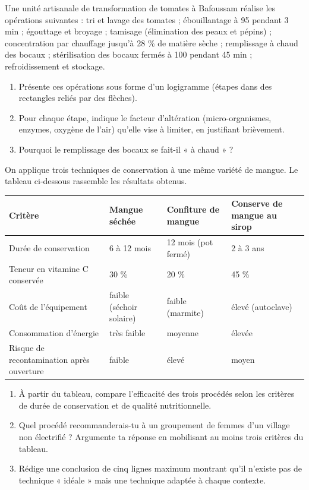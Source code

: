 \documentclass[11pt]{article}
\newcounter{popsec}
\newcounter{popsub}
\newcommand{\courssub}[1]{%
  \stepcounter{popsub}%
  \par\vspace{9pt}\noindent{\popxbold\fontsize{11.5}{13}\selectfont\color{popink}{\color{poporange}\thepopsec.\thepopsub}\hspace{6pt}#1}\par\nopagebreak\vspace{4pt}
}
\begin{document}
\courssub{Je m'entraîne}

\begin{exercice}
Une unité artisanale de transformation de tomates à Bafoussam réalise les opérations suivantes : tri et lavage des tomates ; ébouillantage à 95 \textcelsius{} pendant 3 min ; égouttage et broyage ; tamisage (élimination des peaux et pépins) ; concentration par chauffage jusqu'à 28 \% de matière sèche ; remplissage à chaud des bocaux ; stérilisation des bocaux fermés à 100 \textcelsius{} pendant 45 min ; refroidissement et stockage.
\begin{enumerate}
\item Présente ces opérations sous forme d'un logigramme (étapes dans des rectangles reliés par des flèches).
\item Pour chaque étape, indique le facteur d'altération (micro-organismes, enzymes, oxygène de l'air) qu'elle vise à limiter, en justifiant brièvement.
\item Pourquoi le remplissage des bocaux se fait-il « à chaud » ?
\end{enumerate}
\end{exercice}

\begin{exercice}
On applique trois techniques de conservation à une même variété de mangue. Le tableau ci-dessous rassemble les résultats obtenus.

\begin{center}
\begin{tabularx}{\linewidth}{|l|X|X|X|}\hline
\rowcolor{popblueL} Critère & Mangue séchée & Confiture de mangue & Conserve de mangue au sirop \\ \hline
Durée de conservation & 6 à 12 mois & 12 mois (pot fermé) & 2 à 3 ans \\ \hline
Teneur en vitamine C conservée & 30 \% & 20 \% & 45 \% \\ \hline
Coût de l'équipement & faible (séchoir solaire) & faible (marmite) & élevé (autoclave) \\ \hline
Consommation d'énergie & très faible & moyenne & élevée \\ \hline
Risque de recontamination après ouverture & faible & élevé & moyen \\ \hline
\end{tabularx}
\end{center}

\begin{enumerate}
\item À partir du tableau, compare l'efficacité des trois procédés selon les critères de durée de conservation et de qualité nutritionnelle.
\item Quel procédé recommanderais-tu à un groupement de femmes d'un village non électrifié ? Argumente ta réponse en mobilisant au moins trois critères du tableau.
\item Rédige une conclusion de cinq lignes maximum montrant qu'il n'existe pas de technique « idéale » mais une technique adaptée à chaque contexte.
\end{enumerate}
\end{exercice}
\end{document}
